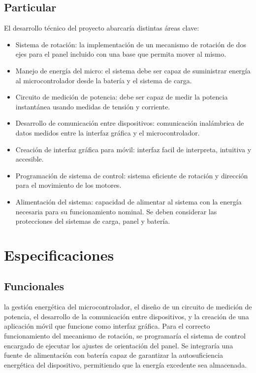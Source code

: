 \documentclass[a4paper,12pt]{article}
\begin{document}
\subsection{Particular}
El desarrollo técnico del proyecto abarcaría distintas áreas clave:
\begin{itemize}
        \item Sistema de rotación: la implementación de un mecanismo de rotación de dos ejes para el panel incluido con una base que permita mover al mismo.
        \item Manejo de energía del micro: el sistema debe ser capaz de suministrar energía al microcontrolador desde la batería y el sistema de carga.
        \item Circuito de medición de potencia: debe ser capaz de medir la potencia instantánea usando medidas de tensión y corriente.
        \item Desarrollo de comunicación entre dispositivos: comunicación inalámbrica de datos medidos entre la interfaz gráfica y el microcontrolador.
        \item Creación de interfaz gráfica para móvil: interfaz facil de interpreta, intuitiva y accesible.
        \item Programación de sistema de control: sistema eficiente de rotación y dirección para el movimiento de los motores.
        \item Alimentación del sistema: capacidad de alimentar al sistema con la energía necesaria para su funcionamiento nominal. Se deben considerar las protecciones del sistemas de carga, panel y batería.
\end{itemize}

\section{Especificaciones}
\subsection{Funcionales}
  la gestión energética del microcontrolador, el diseño de un circuito de medición de potencia, el desarrollo de la comunicación entre dispositivos, y la creación de una aplicación móvil que funcione como interfaz gráfica. Para el correcto funcionamiento del mecanismo de rotación, se programaría el sistema de control encargado de ejecutar los ajustes de orientación del panel. Se integraría una fuente de alimentación con batería capaz de garantizar la autosuficiencia energética del dispositivo, permitiendo que la energía excedente sea almacenada.
\end{document}
